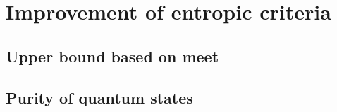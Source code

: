 \chapter{Improvement of entropic criteria}

\section{Upper bound based on meet}



\section{Purity of quantum states}

